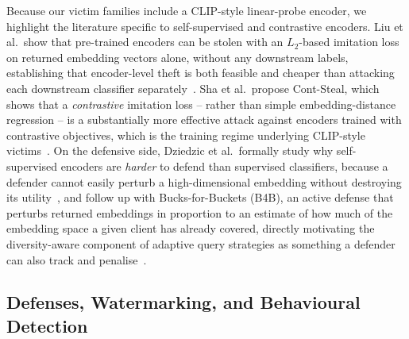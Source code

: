 \documentclass[journal,10pt]{IEEEtran}
\begin{document}
Because our victim families include a CLIP-style linear-probe encoder, we highlight the literature
specific to self-supervised and contrastive encoders. Liu et al.\ show that pre-trained encoders
can be stolen with an $L_2$-based imitation loss on returned embedding vectors alone, without any
downstream labels, establishing that encoder-level theft is both feasible and cheaper than
attacking each downstream classifier separately~\cite{liu2022stolenencoder}. Sha et al.\ propose
Cont-Steal, which shows that a \emph{contrastive} imitation loss -- rather than simple
embedding-distance regression -- is a substantially more effective attack against encoders trained
with contrastive objectives, which is the training regime underlying CLIP-style
victims~\cite{sha2023contsteal}. On the defensive side, Dziedzic et al.\ formally study why
self-supervised encoders are \emph{harder} to defend than supervised classifiers, because a
defender cannot easily perturb a high-dimensional embedding without destroying its
utility~\cite{dziedzic2022ssldefense}, and follow up with Bucks-for-Buckets (B4B), an active
defense that perturbs returned embeddings in proportion to an estimate of how much of the
embedding space a given client has already covered, directly motivating the diversity-aware
component of adaptive query strategies as something a defender can also track and
penalise~\cite{dziedzic2023b4b}.

\subsection{Defenses, Watermarking, and Behavioural Detection}
\end{document}
